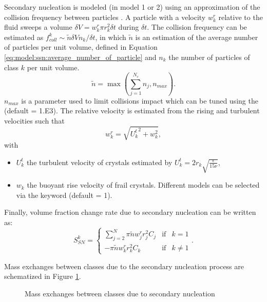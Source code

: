 Secondary nucleation is modeled  (in model 1 or 2) using an approximation of the
collision frequency between particles \cite{Omstedt_1994}.
A particle with a velocity $w^r_k$ relative to the fluid sweeps a volume $\delta V = w^r_k \pi r_k^2 \delta t$
during $\delta t$.
The collision frequency can be estimated as $f^k_{coll} \sim \widetilde{n} \delta V n_k / \delta t$,
in which $\widetilde{n}$ is an estimation of the average number of particles per unit volume, defined in Equation \eqref{eq:model:ssn:average_number_of_particle}
and $n_k$ the number of particles of class $k$ per unit volume.
\begin{equation}
\widetilde{n}=\max \left( \sum_{j=1}^{N_c} n_j, n_{max}\right).
\label{eq:model:ssn:average_number_of_particle}
\end{equation}
$n_{max}$ is a parameter used to limit collisions impact which
can be tuned using the  (default = 1.E3).
The relative velocity is estimated from the rising and turbulent velocities such that
\begin{equation}
w^r_k= \sqrt{ {U^t_k}^2+ w_k^2 },
\label{eq:model:ssn:relative_velocity}
\end{equation}
with
\begin{itemize}
	\item $U^t_k$ the turbulent velocity of crystals estimated by $U^t_k= 2 r_k \sqrt{ \frac{\epsilon}{15 \nu} }$,
	\item $w_k$ the buoyant rise velocity of frail crystals. Different models can be selected via the keyword  (default = 1).
\end{itemize}
Finally, volume fraction change rate due to secondary nucleation can be written as:
\begin{equation}
S_{SN}^{k}=
\left\lbrace \begin{matrix}
\sum_{j=2}^{N} \pi \widetilde{n} w^r_j r_j^2 C_{j} & \text{if} & k=1 \\
-\pi \widetilde{n} w^r_k r_k^2 C_{k} & \text{if} & k \neq 1
\end{matrix} \right. .
\label{eq:model:ssn:source}
\end{equation}

Mass exchanges between classes due to the secondary nucleation process are schematized in Figure \ref{fig:secondary_nucleation}.

\begin{figure}[H]
    \begin{center}
    \end{center}
    \caption{Mass exchanges between classes due to secondary nucleation}
    \label{fig:secondary_nucleation}
\end{figure}

